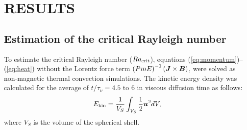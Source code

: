\section{RESULTS}

\subsection{Estimation of the critical Rayleigh number}

To estimate the critical Rayleigh number ($Ra_{\rm crit}$), equations (\ref{eq:momentum})--(\ref{eq:heat}) without the Lorentz force term $\left(Pm E\right)^{-1} \left(\mbox{\boldmath$J$} \times \mbox{\boldmath$B$} \right)$, were solved as non-magnetic thermal convection simulations. The kinetic energy density was calculated for the average of $t / \tau_{\nu} = 4.5$ to 6 in viscous diffusion time as follows: 
%
\begin{equation}
E_{\rm kin} = \frac{1}{V_{S}} \int_{V_{S}} \frac{1}{2} \mbox{\boldmath$u$}^{2} dV,
\label{eq:kinetic_energy}
\end{equation}
%
where $V_{S}$ is the volume of the spherical shell.

